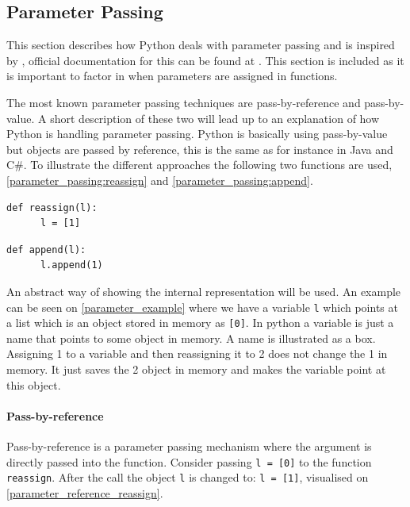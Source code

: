\subsection{Parameter Passing}\label{python:parameter_passing}
This section describes how Python deals with parameter passing and is inspired by \citet{parameter_passing}, official documentation for this can be found at \citet{parameter_passing_official}.
This section is included as it is important to factor in when parameters are assigned in functions.

The most known parameter passing techniques are pass-by-reference and pass-by-value.
A short description of these two will lead up to an explanation of how Python is handling parameter passing.
Python is basically using pass-by-value but objects are passed by reference, this is the same as for instance in Java and C\#.
To illustrate the different approaches the following two functions are used, \cref{parameter_passing:reassign} and \cref{parameter_passing:append}.

\begin{lstlisting}[style=python, caption={Parameter passing: \texttt{reassign} function.}, label={parameter_passing:reassign}]
  def reassign(l):
      l = [1]
\end{lstlisting}

\begin{lstlisting}[style=python, caption={Parameter passing: \texttt{append} function.}, label={parameter_passing:append}]
  def append(l):
      l.append(1)
\end{lstlisting}

An abstract way of showing the internal representation will be used.
An example can be seen on \cref{parameter_example} where we have a variable \texttt{l} which points at a list which is an object stored in memory as \texttt{[0]}.
In python a variable is just a name that points to some object in memory.
A name is illustrated as a box.
Assigning 1 to a variable and then reassigning it to 2 does not change the 1 in memory.
It just saves the 2 object in memory and makes the variable point at this object.


\paragraph{Pass-by-reference}
Pass-by-reference is a parameter passing mechanism where the argument is directly passed into the function.
Consider passing \texttt{l = [0]} to the function \texttt{reassign}.
After the call the object \texttt{l} is changed to: \texttt{l = [1]}, visualised on \cref{parameter_reference_reassign}.

